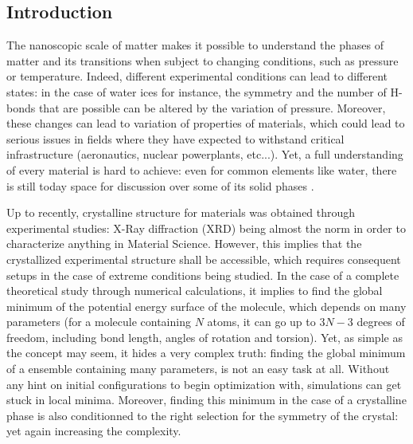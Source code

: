 \documentclass[11pt]{article}
\begin{document}
\begin{multicols}{2}
\section*{Introduction}

The nanoscopic scale of matter makes it possible to understand the phases of matter and its transitions when subject to changing conditions, such as pressure or temperature. Indeed, different experimental conditions can lead to different states: in the case of water ices for instance, the symmetry and the number of H-bonds that are possible can be altered by the variation of pressure. Moreover, these changes can lead to variation of properties of materials, which could lead to serious issues in fields where they have expected to withstand critical infrastructure (aeronautics, nuclear powerplants, etc...). Yet, a full understanding of every material is hard to achieve: even for common elements like water, there is still today space for discussion over some of its solid phases \cite{Hansen2021-bk}.

\noindent Up to recently, crystalline structure for materials was obtained through experimental studies: X-Ray diffraction (XRD) being almost the norm in order to characterize anything in Material Science. However, this implies that the crystallized experimental structure shall be accessible, which requires consequent setups in the case of extreme conditions being studied. In the case of a complete theoretical study through numerical calculations, it implies to find the global minimum of the potential energy surface of the molecule, which depends on many parameters (for a molecule containing $N$ atoms, it can go up to $3N-3$ degrees of freedom, including bond length, angles of rotation and torsion). Yet, as simple as the concept may seem, it hides a very complex truth: finding the global minimum of a ensemble containing many parameters, is not an easy task at all. Without any hint on initial configurations to begin optimization with, simulations can get stuck in local minima. Moreover, finding this minimum in the case of a crystalline phase is also conditionned to the right selection for the symmetry of the crystal: yet again increasing the complexity.


\end{multicols}
\end{document}
